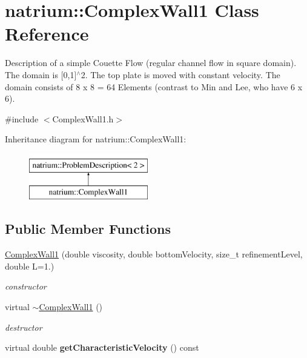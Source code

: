 \hypertarget{classnatrium_1_1ComplexWall1}{\section{natrium\-:\-:Complex\-Wall1 Class Reference}
\label{classnatrium_1_1ComplexWall1}
}


Description of a simple Couette Flow (regular channel flow in square domain). The domain is \mbox{[}0,1\mbox{]}$^\wedge$2. The top plate is moved with constant velocity. The domain consists of 8 x 8 = 64 Elements (contrast to Min and Lee, who have 6 x 6).  




{\ttfamily \#include $<$Complex\-Wall1.\-h$>$}

Inheritance diagram for natrium\-:\-:Complex\-Wall1\-:\begin{figure}[H]
\begin{center}
\leavevmode
\includegraphics[height=2.000000cm]{classnatrium_1_1ComplexWall1}
\end{center}
\end{figure}
\subsection*{Public Member Functions}
\begin{DoxyCompactItemize}
\item 
\hyperlink{classnatrium_1_1ComplexWall1_ad619c81f979a47c447fc0061bed20e05}{Complex\-Wall1} (double viscosity, double bottom\-Velocity, size\-\_\-t refinement\-Level, double L=1.)
\begin{DoxyCompactList}\small\item\em constructor \end{DoxyCompactList}\item 
\hypertarget{classnatrium_1_1ComplexWall1_a6d68cdec98529c139716ae98e8149d30}{virtual \hyperlink{classnatrium_1_1ComplexWall1_a6d68cdec98529c139716ae98e8149d30}{$\sim$\-Complex\-Wall1} ()}\label{classnatrium_1_1ComplexWall1_a6d68cdec98529c139716ae98e8149d30}

\begin{DoxyCompactList}\small\item\em destructor \end{DoxyCompactList}\item 
\hypertarget{classnatrium_1_1ComplexWall1_a782e4262d5c717656803f43eb4e05202}{virtual double {\bfseries get\-Characteristic\-Velocity} () const }\label{classnatrium_1_1ComplexWall1_a782e4262d5c717656803f43eb4e05202}

\end{DoxyCompactItemize}


